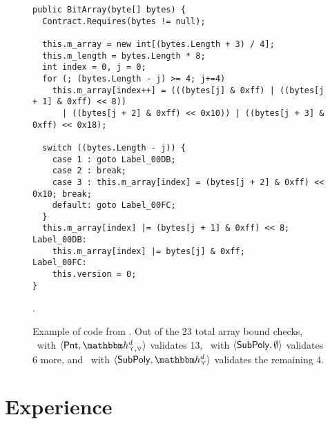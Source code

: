 \documentclass{llncs}
\newcommand{\sopra}{\vspace{-.3cm}}
\begin{document}
\begin{figure}[t]
\centering
{\small
\begin{verbatim}
public BitArray(byte[] bytes) {
  Contract.Requires(bytes != null); 

  this.m_array = new int[(bytes.Length + 3) / 4];
  this.m_length = bytes.Length * 8;
  int index = 0, j = 0;
  for (; (bytes.Length - j) >= 4; j+=4) 
    this.m_array[index++] = (((bytes[j] & 0xff) | ((bytes[j + 1] & 0xff) << 8)) 
      | ((bytes[j + 2] & 0xff) << 0x10)) | ((bytes[j + 3] & 0xff) << 0x18);
    
  switch ((bytes.Length - j)) {
    case 1 : goto Label_00DB;
    case 2 : break;
    case 3 : this.m_array[index] = (bytes[j + 2] & 0xff) << 0x10; break;
    default: goto Label_00FC;
  }
  this.m_array[index] |= (bytes[j + 1] & 0xff) << 8;
Label_00DB:
    this.m_array[index] |= bytes[j] & 0xff;
Label_00FC:
    this.version = 0;
}
\end{verbatim}
}
\caption{Example of code from . Out of the 23 total array bound checks, \Clousot\ with $\tupla{\Pentagons{}, \hint{\cjoin,\widening}^{d}}$ validates 13, \Clousot\ with  $\langle \mathsf{SubPoly}{}, \emptyset \rangle$ validates 6 more, and \Clousot\ with  $\tupla{\Subpoly{}, \hint{\cjoin}^{d}}$ validates the remaining 4. }.
\label{fig:BitArray}
\sopra\sopra
\end{figure}

\sopra
\section{Experience}
\label{sec:experience}
\end{document}
